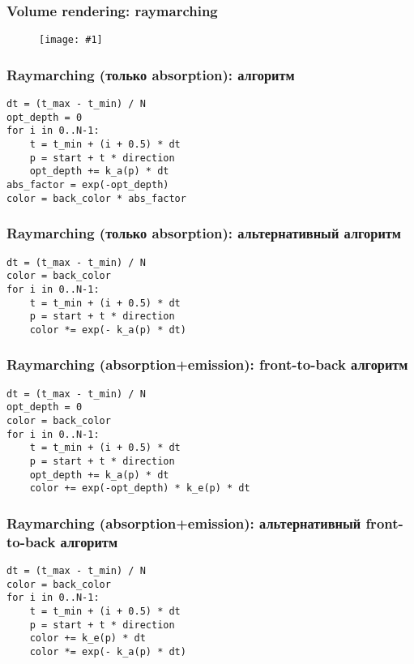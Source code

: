 \documentclass[10pt]{beamer}
\newcommand{\slideimage}[1]{
  \begin{figure}
    \begin{adjustbox}{width=\textwidth, totalheight=\textheight-2\baselineskip-2\baselineskip,keepaspectratio}
      \texttt{[image: \#1]}
    \end{adjustbox}
  \end{figure}
}
\begin{document}
\begin{frame}[fragile]
\frametitle{Volume rendering: raymarching}
\slideimage{raymarching-2.png}
\end{frame}

\begin{frame}[fragile]
\frametitle{Raymarching (только absorption): алгоритм}
\begin{verbatim}
dt = (t_max - t_min) / N
opt_depth = 0
for i in 0..N-1:
    t = t_min + (i + 0.5) * dt
    p = start + t * direction
    opt_depth += k_a(p) * dt
abs_factor = exp(-opt_depth)
color = back_color * abs_factor
\end{verbatim}
\end{frame}

\begin{frame}[fragile]
\frametitle{Raymarching (только absorption): альтернативный алгоритм}
\begin{verbatim}
dt = (t_max - t_min) / N
color = back_color
for i in 0..N-1:
    t = t_min + (i + 0.5) * dt
    p = start + t * direction
    color *= exp(- k_a(p) * dt)
\end{verbatim}
\end{frame}

\begin{frame}[fragile]
\frametitle{Raymarching (absorption+emission): front-to-back алгоритм}
\begin{verbatim}
dt = (t_max - t_min) / N
opt_depth = 0
color = back_color
for i in 0..N-1:
    t = t_min + (i + 0.5) * dt
    p = start + t * direction
    opt_depth += k_a(p) * dt
    color += exp(-opt_depth) * k_e(p) * dt
\end{verbatim}
\end{frame}

\begin{frame}[fragile]
\frametitle{Raymarching (absorption+emission): альтернативный front-to-back алгоритм}
\begin{verbatim}
dt = (t_max - t_min) / N
color = back_color
for i in 0..N-1:
    t = t_min + (i + 0.5) * dt
    p = start + t * direction
    color += k_e(p) * dt
    color *= exp(- k_a(p) * dt)
\end{verbatim}
\end{frame}
\end{document}
